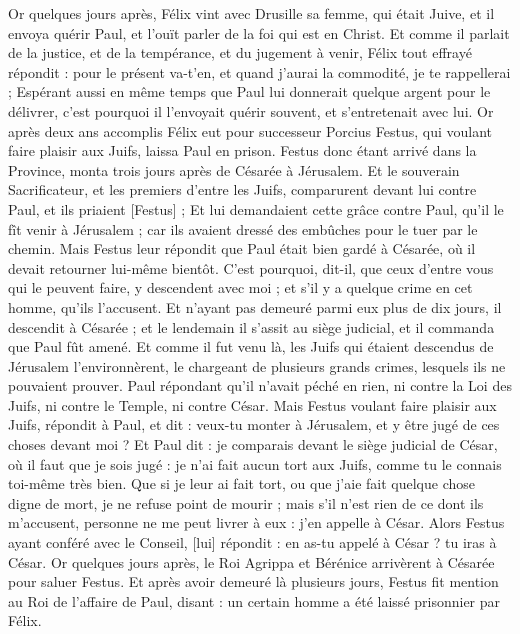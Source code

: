 \begin{multicols}{2}
Or quelques jours après, Félix vint avec Drusille sa femme, qui était Juive, et il envoya quérir Paul, et l'ouït parler de la foi qui est en Christ.
Et comme il parlait de la justice, et de la tempérance, et du jugement à venir, Félix tout effrayé répondit : pour le présent va-t'en, et quand j'aurai la commodité, je te rappellerai ;
Espérant aussi en même temps que Paul lui donnerait quelque argent pour le délivrer, c'est pourquoi il l'envoyait quérir souvent, et s'entretenait avec lui.
Or après deux ans accomplis Félix eut pour successeur Porcius Festus, qui voulant faire plaisir aux Juifs, laissa Paul en prison.
\VerseOne{}Festus donc étant arrivé dans la Province, monta trois jours après de Césarée à Jérusalem.
Et le souverain Sacrificateur, et les premiers d'entre les Juifs, comparurent devant lui contre Paul, et ils priaient [Festus] ;
Et lui demandaient cette grâce contre Paul, qu'il le fît venir à Jérusalem ; car ils avaient dressé des embûches pour le tuer par le chemin.
Mais Festus leur répondit que Paul était bien gardé à Césarée, où il devait retourner lui-même bientôt.
C'est pourquoi, dit-il, que ceux d'entre vous qui le peuvent faire, y descendent avec moi ; et s'il y a quelque crime en cet homme, qu'ils l'accusent.
Et n'ayant pas demeuré parmi eux plus de dix jours, il descendit à Césarée ; et le lendemain il s'assit au siège judicial, et il commanda que Paul fût amené.
Et comme il fut venu là, les Juifs qui étaient descendus de Jérusalem l'environnèrent, le chargeant de plusieurs grands crimes, lesquels ils ne pouvaient prouver.
Paul répondant qu'il n'avait péché en rien, ni contre la Loi des Juifs, ni contre le Temple, ni contre César.
Mais Festus voulant faire plaisir aux Juifs, répondit à Paul, et dit : veux-tu monter à Jérusalem, et y être jugé de ces choses devant moi ?
Et Paul dit : je comparais devant le siège judicial de César, où il faut que je sois jugé : je n'ai fait aucun tort aux Juifs, comme tu le connais toi-même très bien.
Que si je leur ai fait tort, ou que j'aie fait quelque chose digne de mort, je ne refuse point de mourir ; mais s'il n'est rien de ce dont ils m'accusent, personne ne me peut livrer à eux : j'en appelle à César.
Alors Festus ayant conféré avec le Conseil, [lui] répondit : en as-tu appelé à César ? tu iras à César.
Or quelques jours après, le Roi Agrippa et Bérénice arrivèrent à Césarée pour saluer Festus.
Et après avoir demeuré là plusieurs jours, Festus fit mention au Roi de l'affaire de Paul, disant : un certain homme a été laissé prisonnier par Félix.

\end{multicols}
